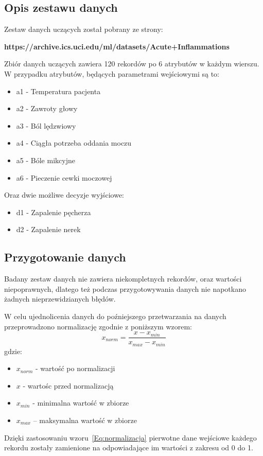 \documentclass[12pt,twoside]{article}
\begin{document}
\subsection{Opis zestawu danych}
Zestaw danych uczących został pobrany ze strony:

\textbf{https://archive.ics.uci.edu/ml/datasets/Acute+Inflammations}
 
Zbiór danych uczących zawiera 120 rekordów po 6 atrybutów w każdym wierszu.
W przypadku atrybutów, będących parametrami wejściowymi są to:
\begin{itemize}
\item a1 - Temperatura pacjenta
\item a2 - Zawroty głowy
\item a3 - Ból lędzwiowy
\item a4 - Ciągła potrzeba oddania moczu
\item a5 - Bóle mikcyjne
\item a6 - Pieczenie cewki moczowej
\end{itemize}

Oraz dwie możliwe decyzje wyjściowe:
\begin{itemize}
	\item d1 - Zapalenie pęcherza
	\item d2 - Zapalenie nerek
\end{itemize}

\subsection{Przygotowanie danych}
Badany zestaw danych nie zawiera niekompletnych rekordów, oraz wartości niepoprawnych, dlatego też podczas przygotowywania danych nie napotkano żadnych nieprzewidzianych błędów.

W celu ujednolicenia danych do poźniejszego przetwarzania na danych przeprowadzono normalizację zgodnie z poniższym wzorem:
\begin{equation}
    x_{norm}=\frac{x-x_{min}}{x_{max}-x_{min}}
    \label{Eq:normalizacja}
\end{equation}
gdzie:
\begin{itemize}
    \setlength\itemsep{0em}
    \item $x_{norm}$ - wartość po normalizacji
    \item $x$ - wartośc przed normalizacją
    \item $x_{min}$ - minimalna wartość w zbiorze
    \item $x_{max}$ – maksymalna wartość w zbiorze
\end{itemize}
Dzięki zastosowaniu wzoru~\ref{Eq:normalizacja} pierwotne dane wejściowe każdego rekordu zostały zamienione na odpowiadające im wartości z zakresu od 0 do 1.
\end{document}
